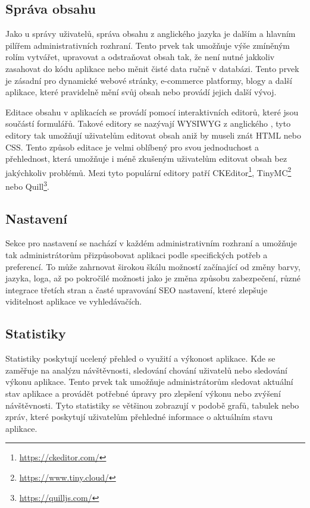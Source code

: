 \subsection{Správa obsahu}
\label{subsec:admin-elements-content-management}
Jako u správy uživatelů, správa obsahu z anglického jazyka \textit{} je dalším a hlavním pilířem administrativních rozhraní. Tento prvek tak umožňuje výše zmíněným rolím vytvářet, upravovat a odstraňovat obsah tak, že není nutné jakkoliv zasahovat do kódu aplikace nebo měnit čisté data ručně v databázi. Tento prvek je zásadní pro dynamické webové stránky, e-commerce platformy, blogy a další aplikace, které pravidelně mění svůj obsah nebo provádí jejich další vývoj.

Editace obsahu v aplikacích se provádí pomocí interaktivních editorů, které jsou součástí formulářů. Takové editory se nazývají WYSIWYG z anglického \textit{}, tyto editory tak umožňují uživatelům editovat obsah aniž by museli znát HTML nebo CSS. Tento způsob editace je velmi oblíbený pro svou jednoduchost a přehlednost, která umožňuje i méně zkušeným uživatelům editovat obsah bez jakýchkoliv problémů. Mezi tyto populární editory patří CKEditor\footnote[1]{\url{https://ckeditor.com/}}, TinyMC\footnote[2]{\url{https://www.tiny.cloud/}} nebo Quill\footnote[3]{\url{https://quilljs.com/}}.

\subsection{Nastavení}
\label{subsec:admin-elements-settings}
Sekce pro nastavení se nachází v každém administrativním rozhraní a umožňuje tak administrátorům přizpůsobovat aplikaci podle specifických potřeb a preferencí. To může zahrnovat širokou škálu možností začínající od změny barvy, jazyka, loga, až po pokročilé možnosti jako je změna způsobu zabezpečení, různé integrace třetích stran a časté upravování SEO nastavení, které zlepšuje viditelnost aplikace ve vyhledávačích.

\subsection{Statistiky}
\label{subsec:admin-elements-statistics}
Statistiky poskytují ucelený přehled o využití a výkonost aplikace. Kde se zaměřuje na analýzu návštěvnosti, sledování chování uživatelů nebo sledování výkonu aplikace. Tento prvek tak umožňuje administrátorům sledovat aktuální stav aplikace a provádět potřebné úpravy pro zlepšení výkonu nebo zvýšení návštěvnosti.
Tyto statistiky se většinou zobrazují v podobě grafů, tabulek nebo zpráv, které poskytují uživatelům přehledné informace o aktuálním stavu aplikace.

